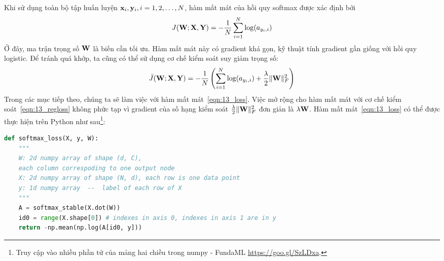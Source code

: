 Khi sử dụng toàn bộ tập huấn luyện $\mathbf{x}_i, \mathbf{y}_i, i = 1, 2, \dots, N$,
hàm mất mát của hồi quy softmax được xác định bởi
\begin{equation}
\label{eqn:13_loss}
J(\mathbf{W}; \mathbf{X}, \mathbf{Y}) = -\frac{1}{N}\sum_{i = 1}^N
\log(a_{y_i,i})
\end{equation}
Ở đây, ma trận trọng số $\mathbf{W}$ là biến cần tối ưu. Hàm mất mát này có gradient khá
gọn, kỹ thuật tính gradient gần giống với hồi quy logistic. Để tránh quá khớp, ta cũng có thể sử dụng cơ chế kiểm soát suy giảm trọng số:
\begin{equation}
\label{eqn:13_regloss}
\bar{J}(\mathbf{W}; \mathbf{X}, \mathbf{Y}) =
-\frac{1}{N}\left(\sum_{i = 1}^N \log(a_{y_i,i}) + \frac{\lambda}{2} \|\mathbf{W}\|_F^2 \right)
\end{equation}
Trong các mục tiếp theo, chúng ta sẽ làm việc với hàm mất
mát~\eqref{eqn:13_loss}. Việc mở rộng cho hàm mất mát với
cơ chế kiểm soát~\eqref{eqn:13_regloss} không phức tạp vì gradient của số hạng
kiểm soát $\frac{\lambda}{2}\|\mathbf{W}\|_F^2$ đơn giản là $\lambda \mathbf{W}$. Hàm mất
mát~\eqref{eqn:13_loss} có thể được thực hiện trên Python như sau\footnote{{Truy cập vào nhiều phần tử của mảng hai
chiều trong numpy - FundaML} \url{https://goo.gl/SzLDxa}.}:
\begin{lstlisting}[language=Python]
def softmax_loss(X, y, W):
    """
    W: 2d numpy array of shape (d, C),
    each column correspoding to one output node
    X: 2d numpy array of shape (N, d), each row is one data point
    y: 1d numpy array  --  label of each row of X
    """
    A = softmax_stable(X.dot(W))
    id0 = range(X.shape[0]) # indexes in axis 0, indexes in axis 1 are in y
    return -np.mean(np.log(A[id0, y]))
\end{lstlisting}

